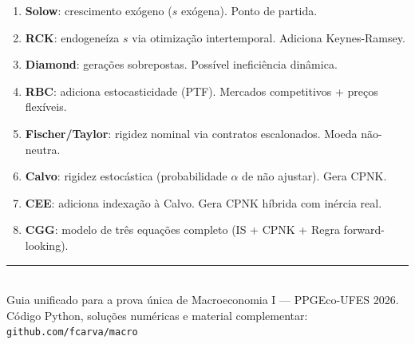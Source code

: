 \documentclass[12pt, a4paper]{article}
\begin{document}
\begin{center}
\begin{formulabox}[title={Lógica da Sequência de Modelos}]
\begin{enumerate}[leftmargin=1.5em, itemsep=3pt]
  \item \textbf{Solow}: crescimento exógeno ($s$ exógena). Ponto de partida.
  \item \textbf{RCK}: endogeneíza $s$ via otimização intertemporal. Adiciona Keynes-Ramsey.
  \item \textbf{Diamond}: gerações sobrepostas. Possível ineficiência dinâmica.
  \item \textbf{RBC}: adiciona estocasticidade (PTF). Mercados competitivos + preços flexíveis.
  \item \textbf{Fischer/Taylor}: rigidez nominal via contratos escalonados. Moeda não-neutra.
  \item \textbf{Calvo}: rigidez estocástica (probabilidade $\alpha$ de não ajustar). Gera CPNK.
  \item \textbf{CEE}: adiciona indexação à Calvo. Gera CPNK híbrida com inércia real.
  \item \textbf{CGG}: modelo de três equações completo (IS + CPNK + Regra forward-looking).
\end{enumerate}
\end{formulabox}
\end{center}

\begin{center}
\rule{0.5\linewidth}{0.4pt}\\[0.5em]
{\small Guia unificado para a prova única de Macroeconomia I --- PPGEco-UFES 2026.\\
Código Python, soluções numéricas e material complementar: \texttt{github.com/fcarva/macro}}
\end{center}
\end{document}
